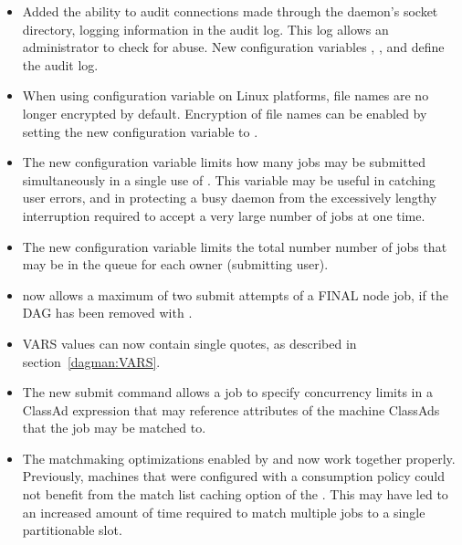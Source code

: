 \begin{itemize}

\item Added the ability to audit connections made through the
 daemon's socket directory, 
logging information in the  audit log.
This log allows an administrator to check for abuse.
New configuration variables ,
,
and  define the
 audit log.

\item When using configuration variable 
on Linux platforms, 
file names are no longer encrypted by default.  
Encryption of file names can be enabled by setting 
the new configuration variable  
to .

\item The new configuration variable 
limits how many jobs may be submitted simultaneously in a single
use of .  This variable may be useful in catching user errors,
and in protecting a busy  daemon
from the excessively lengthy interruption
required to accept a very large number of jobs at one time.

\item The new configuration variable 
limits the total number number of jobs that may be in the queue for each
owner (submitting user).

\item {} now allows a maximum of two submit attempts of a FINAL
node job, if the DAG has been removed with .

\item {} VARS values can now contain single quotes,
as described in section~\ref{dagman:VARS}.

\item 
The new submit command 
allows a job to specify concurrency limits in a ClassAd expression 
that may reference attributes of the machine ClassAds that the job
may be matched to.

\item The matchmaking optimizations enabled by 
and  now work together properly.
Previously, machines that were configured with a consumption policy
could not benefit from the match list caching option of the
.
This may have led to an increased amount of time required to match
multiple jobs to a single partitionable slot.


\end{itemize}

